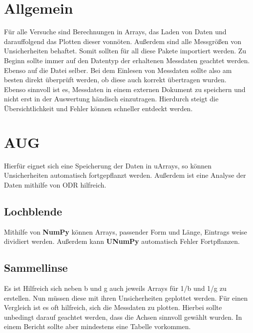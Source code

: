 \documentclass[a4paper,12pt]{article}
\begin{document}
\setcounter{section}{1} %

\section*{Allgemein}
Für alle Versuche sind Berechnungen in Arrays, das Laden von Daten und darauffolgend das Plotten dieser vonnöten. Außerdem sind alle Messgrößen von Unsicherheiten behaftet. Somit sollten für all diese Pakete importiert werden.
\newline \newline
Zu Beginn sollte immer auf den Datentyp der erhaltenen Messdaten geachtet werden. Ebenso auf die Datei selber. Bei dem Einlesen von Messdaten sollte also am besten direkt überprüft werden, ob diese auch korrekt übertragen wurden. Ebenso sinnvoll ist es, Messdaten in einem externen Dokument zu speichern und nicht erst in der Auswertung händisch einzutragen. Hierdurch steigt die Übersichtlichkeit und Fehler können schneller entdeckt werden.

\section{AUG}

\begin{center}
\begin{tcolorbox}[
colback=gray!20,     %
colframe=red,        %
width=0.8\textwidth, %
boxrule=1pt,         %
arc=1mm,             %
]
Hierfür eignet sich eine Speicherung der Daten in uArrays, so können Unsicherheiten automatisch fortgepflanzt werden. Außerdem ist eine Analyse der Daten mithilfe von ODR hilfreich.
\end{tcolorbox}
\end{center}

\subsection{Lochblende}
Mithilfe von \textbf{NumPy} können Arrays, passender Form und Länge, Eintrags weise dividiert werden. Außerdem kann \textbf{UNumPy} automatisch Fehler Fortpflanzen.

\subsection{Sammellinse}
Es ist Hilfreich sich neben b und g auch jeweils Arrays für 1/b und 1/g zu erstellen. Nun müssen diese mit ihren Unsicherheiten geplottet werden.
\newline \newline
Für einen Vergleich ist es oft hilfreich, sich die Messdaten zu plotten. Hierbei sollte unbedingt darauf geachtet werden, dass die Achsen sinnvoll gewählt wurden. In einem Bericht sollte aber mindestens eine Tabelle vorkommen.
\end{document}
